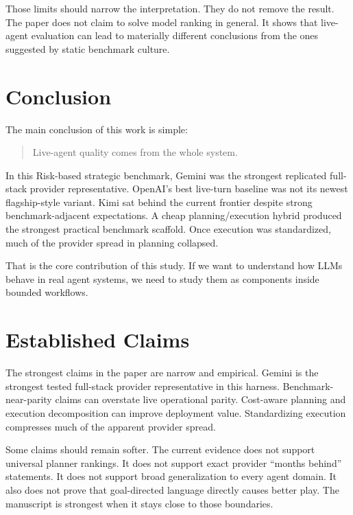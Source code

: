 \documentclass[11pt]{article}
\begin{document}
Those limits should narrow the interpretation. They do not remove the result. The paper does not claim to solve model ranking in general. It shows that live-agent evaluation can lead to materially different conclusions from the ones suggested by static benchmark culture.

\section{Conclusion}

The main conclusion of this work is simple:

\begin{quote}
Live-agent quality comes from the whole system.
\end{quote}

In this Risk-based strategic benchmark, Gemini was the strongest replicated full-stack provider representative. OpenAI's best live-turn baseline was not its newest flagship-style variant. Kimi sat behind the current frontier despite strong benchmark-adjacent expectations. A cheap planning/execution hybrid produced the strongest practical benchmark scaffold. Once execution was standardized, much of the provider spread in planning collapsed.

That is the core contribution of this study. If we want to understand how LLMs behave in real agent systems, we need to study them as components inside bounded workflows.

\section{Established Claims}

The strongest claims in the paper are narrow and empirical. Gemini is the strongest tested full-stack provider representative in this harness. Benchmark-near-parity claims can overstate live operational parity. Cost-aware planning and execution decomposition can improve deployment value. Standardizing execution compresses much of the apparent provider spread.

Some claims should remain softer. The current evidence does not support universal planner rankings. It does not support exact provider ``months behind'' statements. It does not support broad generalization to every agent domain. It also does not prove that goal-directed language directly causes better play. The manuscript is strongest when it stays close to those boundaries.

\appendix
\end{document}
